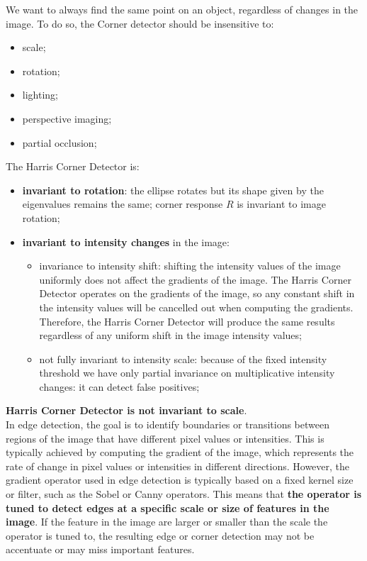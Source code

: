 \documentclass{article}
\begin{document}
We want to always find the same point on an object, regardless of changes in the image. To do so, the Corner detector should be insensitive to:

\begin{itemize}
    \item scale;
    \item rotation;
    \item lighting;
    \item perspective imaging;
    \item partial occlusion;
\end{itemize}

The Harris Corner Detector is:
\begin{itemize}
    \item \textbf{invariant to rotation}: the ellipse rotates but its shape given by the eigenvalues remains the same; corner response $R$ is invariant to image rotation;
    \item \textbf{invariant to intensity changes} in the image: 
    \begin{itemize}
        \item invariance to intensity shift: shifting the intensity values of the image uniformly does not affect the gradients of the image. The Harris Corner Detector operates on the gradients of the image, so any constant shift in the intensity values will be cancelled out when computing the gradients. Therefore, the Harris Corner Detector will produce the same results regardless of any uniform shift in the image intensity values;
        \item not fully invariant to intensity scale: because of the fixed intensity threshold we have only partial invariance on multiplicative intensity changes: it can detect false positives;
    \end{itemize}
\end{itemize}

\textbf{Harris Corner Detector is not invariant to scale}. \\

In edge detection, the goal is to identify boundaries or transitions between regions of the image that have different pixel values or intensities. This is typically achieved by computing the gradient of the image, which represents the rate of change in pixel values or intensities in different directions. However, the gradient operator used in edge detection is typically based on a fixed kernel size or filter, such as the Sobel or Canny operators. This means that \textbf{the operator is tuned to detect edges at a specific scale or size of features in the image}. If the feature in the image are larger or smaller than the scale the operator is tuned to, the resulting edge or corner detection may not be accentuate or may miss important features. \\
\end{document}
